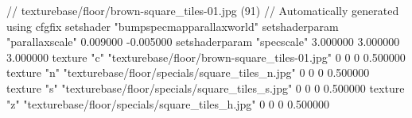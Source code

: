 // texturebase/floor/brown-square_tiles-01.jpg (91)
// Automatically generated using cfgfix
setshader "bumpspecmapparallaxworld"
setshaderparam "parallaxscale" 0.009000 -0.005000
setshaderparam "specscale" 3.000000 3.000000 3.000000
texture "c" "texturebase/floor/brown-square_tiles-01.jpg" 0 0 0 0.500000
texture "n" "texturebase/floor/specials/square_tiles_n.jpg" 0 0 0 0.500000
texture "s" "texturebase/floor/specials/square_tiles_s.jpg" 0 0 0 0.500000
texture "z" "texturebase/floor/specials/square_tiles_h.jpg" 0 0 0 0.500000

